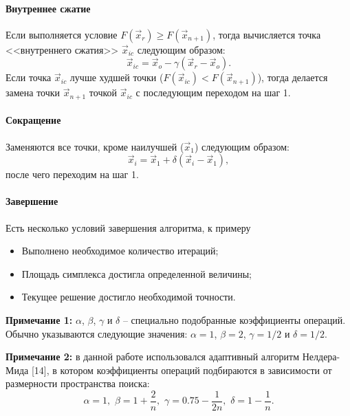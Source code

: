 \paragraph{Внутреннее сжатие}
\noindent\indent Если выполняется условие $F(\vec{x}_r) \geq F(\vec{x}_{n+1})$,
тогда вычисляется точка <<внутреннего сжатия>> $\vec{x}_{ic}$ следующим образом:
\begin{equation}
  \vec{x}_{ic} = \vec{x}_o - \gamma(\vec{x}_{r} - \vec{x}_o).
\end{equation}
Если точка $\vec{x}_{ic}$ лучше худшей точки ($F(\vec{x}_{ic}) < F(\vec{x}_{n+1})$),
тогда делается замена точки $\vec{x}_{n+1}$ точкой $\vec{x}_{ic}$ с последующим
переходом на шаг 1.
\paragraph{Сокращение}
\noindent\indent Заменяются все точки, кроме наилучшей ($\vec{x}_1$) следующим образом:
\begin{equation}
  \vec{x}_i = \vec{x}_1 + \delta(\vec{x}_i - \vec{x}_1),
\end{equation}
после чего переходим на шаг 1.\par
\paragraph{Завершение}
\noindent\indent Есть несколько условий завершения алгоритма, к примеру\par
\begin{itemize}
  \item Выполнено необходимое количество итераций;
  \item Площадь симплекса достигла определенной величины;
  \item Текущее решение достигло необходимой точности.
\end{itemize}\par
  \textbf{Примечание 1:} $\alpha$, $\beta$, $\gamma$ и $\delta$ -- специально подобранные
коэффициенты операций. Обычно указываются следующие значения:
$\alpha = 1$, $\beta = 2$, $\gamma = 1/2$ и $\delta = 1/2$.\par
    \textbf{Примечание 2:} в данной работе использовался адаптивный алгоритм
Нелдера-Мида [14], в котором коэффициенты операций подбираются в зависимости от
размерности пространства поиска:
\begin{equation}
    \alpha = 1,\,\, \beta = 1 + \frac{2}{n},\,\,
    \gamma = 0.75 - \frac{1}{2n},\,\, \delta = 1 - \frac{1}{n}.
\end{equation}

